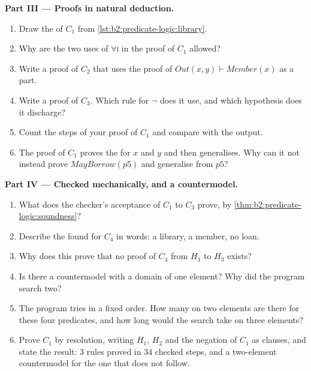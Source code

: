 \begin{problem}
\medskip\noindent\textbf{Part III --- Proofs in natural deduction.}\par\nopagebreak
\begin{enumerate}[resume, beginpenalty=10000]
\item Draw the  of $C_1$ from \cref{lst:b2:predicate-logic:library}.
\item Why are the two uses of $\forall$\textsc{i} in the proof of $C_1$ allowed?
\item Write a proof of $C_2$ that uses the proof of $\mathit{Out}(x, y) \vdash \mathit{Member}(x)$ as a part.
\item Write a proof of $C_3$. Which rule for $\neg$ does it use, and which hypothesis does it discharge?
\item Count the steps of your proof of $C_1$ and compare with the output.
\item The proof of $C_1$ proves the  for $x$ and $y$ and then generalises. Why can it not instead prove
$\mathit{MayBorrow}(p5)$ and generalise from $p5$?
\end{enumerate}

\medskip\noindent\textbf{Part IV --- Checked mechanically, and a countermodel.}\par\nopagebreak
\begin{enumerate}[resume, beginpenalty=10000]
\item What does the checker's acceptance of $C_1$ to $C_3$ prove, by \cref{thm:b2:predicate-logic:soundness}?
\item Describe the  found for $C_4$ in words: a library, a member, no loan.
\item Why does this  prove that no proof of $C_4$ from $H_1$ to $H_3$ exists?
\item Is there a countermodel with a domain of one element? Why did the program search two?
\item The program tries  in a fixed order. How many  on two elements are there for these four
predicates, and how long would the search take on three elements?
\item Prove $C_1$ by resolution, writing $H_1$, $H_2$ and the negation of $C_1$ as clauses, and state the result: 3
rules proved in 34 checked steps, and a two-element countermodel for the one that does not follow.
\end{enumerate}
\end{problem}
